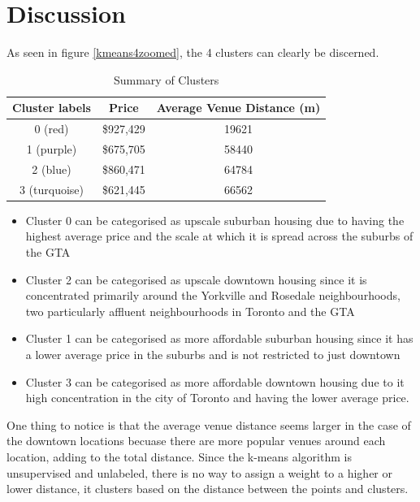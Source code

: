 \documentclass{article}
\begin{document}
\clearpage
\section{Discussion}

As seen in figure \ref{kmeans4zoomed}, the 4 clusters can clearly be discerned. 

\begin{table}[h!]
	\begin{center}
		\caption{Summary of Clusters}
		\label{tab:table1}
		\vspace{2mm}
		\begin{tabular}{c|c|c} %
			\textbf{Cluster labels} & \textbf{Price} & \textbf{Average Venue Distance (m)}\\
			\hline
			0 (red) & \$927,429 & 19621 \\
			1 (purple) & \$675,705 & 58440\\
			2 (blue) & \$860,471 & 64784\\
			3 (turquoise) & \$621,445 & 66562\\
		\end{tabular}
	\end{center}
\end{table}

\begin{itemize}
	\item Cluster 0 can be categorised as upscale suburban housing due to having the highest average price and the scale at which it is spread across the suburbs of the GTA
	\item Cluster 2 can be categorised as upscale downtown housing since it is concentrated primarily around the Yorkville and Rosedale neighbourhoods, two particularly affluent neighbourhoods in Toronto and the GTA
	\item Cluster 1 can be categorised as more affordable suburban housing since it has a lower average price in the suburbs and is not restricted to just downtown
	\item Cluster 3 can be categorised as more affordable downtown housing due to it high concentration in the city of Toronto and having the lower average price.
\end{itemize}

One thing to notice is that the average venue distance seems larger in the case of the downtown locations becuase there are more popular venues around each location, adding to the total distance. Since the k-means algorithm is unsupervised and unlabeled, there is no way to assign a weight to a higher or lower distance, it clusters based on the distance between the points and clusters.
\end{document}
